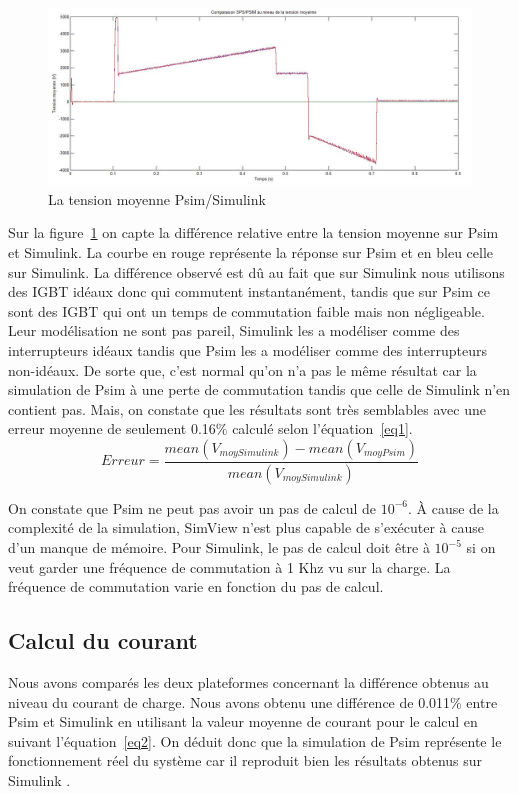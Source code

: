\documentclass[11pt,letterpaper,final]{report}
\begin{document}
\begin{figure}[h!]
\centering
\includegraphics[scale=0.4]{fig/tmoypsim_sim.jpg}
\caption{La tension moyenne Psim/Simulink}
\label{moyt}
\end{figure}
Sur la figure~\ref{moyt} on capte la différence relative entre la tension moyenne sur Psim et Simulink. La courbe en rouge représente la réponse sur Psim et en bleu celle sur Simulink. La différence observé est dû au fait que sur Simulink nous utilisons des IGBT idéaux donc qui commutent instantanément, tandis que sur Psim ce sont des IGBT qui ont un temps de commutation faible mais non négligeable. Leur modélisation ne sont pas pareil, Simulink les a modéliser comme des interrupteurs idéaux tandis que Psim les a modéliser comme des interrupteurs non-idéaux. De sorte que, c'est normal qu'on n'a pas le même résultat car la simulation de Psim à une perte de commutation tandis que celle de Simulink n'en contient pas. Mais, on constate que les résultats sont très semblables avec une erreur moyenne de seulement 0.16\% calculé selon l'équation~\ref{eq1}.
\begin{equation}
Erreur = \frac{mean(V_{moy Simulink})-mean(V_{moy Psim})}{mean(V_{moy Simulink})}
\label{eq1}
\end{equation}

On constate que Psim ne peut pas avoir un pas de calcul de $10^{-6}$. À cause de la complexité de la simulation, SimView n'est plus capable de s'exécuter à cause d'un manque de mémoire. Pour Simulink, le pas de calcul doit être à $10^{-5}$ si on veut garder une fréquence de commutation à 1 Khz vu sur la charge. La fréquence de commutation varie en fonction du pas de calcul.


\subsection{Calcul du courant}
Nous avons comparés les deux plateformes concernant la différence obtenus au niveau du courant de charge. Nous avons obtenu une différence de 0.011\%
entre Psim et Simulink en utilisant la valeur moyenne de courant pour le calcul en suivant l'équation~\ref{eq2}. On déduit donc que la simulation de Psim représente le fonctionnement réel du système car il reproduit bien les résultats obtenus sur Simulink .
 
\end{document}
